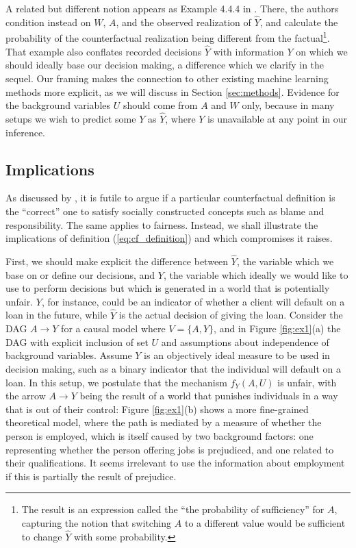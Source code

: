 A related but different notion appears as Example 4.4.4 in
\citet{pearl:16}. There, the authors condition instead on $W$, $A$,
and the observed realization of $\hat Y$, and calculate the
probability of the counterfactual realization being different from the
factual\footnote{The result is an expression called the ``the
  probability of sufficiency'' for $A$, capturing the notion that
  switching $A$ to a different value would be sufficient to change
  $\hat Y$ with some probability.}. That example also conflates
recorded decisions $\hat Y$ with information $Y$ on which we should ideally
base our decision making, a difference which we clarify in the
sequel.  Our framing makes the connection to other
existing machine learning methods more explicit, as we will discuss in
Section \ref{sec:methods}.  Evidence for the background variables $U$ should come from
$A$ and $W$ only, because in many setups we wish to predict some $Y$
as $\hat Y$, where   $Y$ is unavailable at any point
in our inference.

\subsection{Implications}
%
As discussed by \citet{halpern:16}, it is futile to argue if a
particular counterfactual definition is the ``correct'' one to satisfy
socially constructed concepts such as blame and responsibility. The
same applies to fairness. Instead, we shall illustrate the
implications of definition (\ref{eq:cf_definition}) and which
compromises it raises.

First, we should make explicit the difference between $\hat Y$, the
variable which we base on or define our decisions, and $Y$, the variable which
ideally we would like to use to perform decisions but which is
generated in a world that is potentially unfair. $Y$, for instance,
could be an indicator of whether a client will default on a loan in
the future, while $\hat Y$ is the actual decision of giving the
loan. Consider the DAG $A \rightarrow Y$ for a causal model where $V =
\{A, Y\}$, and in Figure \ref{fig:ex1}(a) the DAG with explicit
inclusion of set $U$ and assumptions about independence of background
variables. Assume $Y$ is an objectively ideal measure to be used in
decision making, such as a binary indicator that the individual will
default on a loan. In this setup, we postulate that the mechanism
$f_Y(A, U)$ is unfair, with the arrow $A \rightarrow Y$ being the
result of a world that punishes individuals in a way that is out of
their control: Figure \ref{fig:ex1}(b) shows a more fine-grained
theoretical model, where the path is mediated by a measure of
whether the person is employed, which is itself caused by
two background factors: one representing whether the person offering jobs is
prejudiced, and one related to their qualifications. It seems irrelevant
to use the information about employment if this is partially the result
of prejudice.

